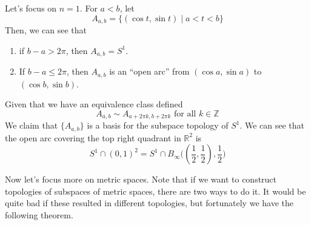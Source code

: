   \begin{example}
    Let's focus on $n = 1$. For $a < b$, let 
    \begin{equation}
      A_{a, b} = \{ (\cos{t}, \sin{t}) \mid a < t < b \}
    \end{equation} 
    Then, we can see that
    \begin{enumerate}
      \item if $b - a > 2 \pi$, then $A_{a, b} = S^1$. 
      \item If $b - a \leq 2 \pi$, then $A_{a, b}$ is an ``open arc'' from $(\cos{a}, \sin{a})$ to $(\cos{b}, \sin{b})$.  
    \end{enumerate} 

    Given that we have an equivalence class defined 
    \begin{equation}
      A_{a, b} \sim A_{a + 2 \pi k, b + 2 \pi k} \text{ for all } k \in \mathbb{Z}
    \end{equation} 
    We claim that $\{A_{a, b}\}$ is a basis for the subspace topology of $S^1$. We can see that the open arc covering the top right quadrant in $\mathbb{R}^2$ is 
    \begin{equation}
      S^1 \cap (0, 1)^2 = S^1 \cap B_\infty \big( (\frac{1}{2}, \frac{1}{2}), \frac{1}{2} \big)
    \end{equation}
  \end{example}

  Now let's focus more on metric spaces. Note that if we want to construct topologies of subspaces of metric spaces, there are two ways to do it. It would be quite bad if these resulted in different topologies, but fortunately we have the following theorem. 


